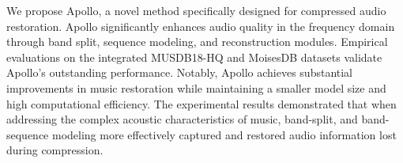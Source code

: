 We propose Apollo, a novel method specifically designed for compressed audio restoration. Apollo significantly enhances audio quality in the frequency domain through band split, sequence modeling, and reconstruction modules. Empirical evaluations on the integrated MUSDB18-HQ and MoisesDB datasets validate Apollo's outstanding performance. Notably, Apollo achieves substantial improvements in music restoration while maintaining a smaller model size and high computational efficiency. The experimental results demonstrated that when addressing the complex acoustic characteristics of music, band-split, and band-sequence modeling more effectively captured and restored audio information lost during compression.